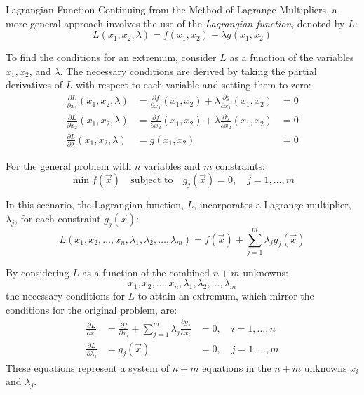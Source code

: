 \documentclass[
    NAME={Dr. Helga Ingimundardóttir},
    EMAIL={helgaingim@hi.is},
    FACULTY={Industrial Engineering},
    TITLE={Nonlinear Optimization},
    SUBTITLE={Approaches and Challenges},
    SEMINAR={VÉL113F},
    DATE={Design and Optimization}
]{../HI-latex/hi-beamer}
\begin{document}
    \begin{frame}{Lagrangian Function}
        Continuing from the Method of Lagrange Multipliers, a more general approach involves the use of the
        \emph{Lagrangian function}, denoted by \(L\):
        \[ L(x_1,x_2,\lambda) = f(x_1,x_2)+\lambda g(x_1,x_2)\]

        To find the conditions for an extremum, consider $L$ as a function of the variables $x_1, x_2$, and $\lambda$.
        The necessary conditions are derived by taking the partial derivatives of $L$ with respect to each
        variable and setting them to zero:
        \begin{align*}
            \frac{\partial L}{\partial x_1}(x_1,x_2,\lambda) &= \frac{\partial f}{\partial x_1}(x_1,x_2)+\lambda\frac{\partial g}{\partial x_1}(x_1,x_2) &= 0 \\
            \frac{\partial L}{\partial x_2}(x_1,x_2,\lambda) &= \frac{\partial f}{\partial x_2}(x_1,x_2)+\lambda\frac{\partial g}{\partial x_2}(x_1,x_2) &= 0 \\
            \frac{\partial L}{\partial \lambda}(x_1,x_2,\lambda) &= g(x_1,x_2) &= 0
        \end{align*}

        \framebreak

        For the general problem with \(n\) variables and \(m\) constraints:
        \[ \min f(\vec{x}) \quad \text{subject to}\quad g_j(\vec{x})=0, \quad j=1,\ldots,m\]

        In this scenario, the Lagrangian function, \(L\), incorporates a Lagrange multiplier, \(\lambda_j\), for each
        constraint \(g_j(\vec{x})\):
        \[ L(x_1,x_2,\ldots,x_n,\lambda_1,\lambda_2,\ldots,\lambda_m) =
        f(\vec{x}) + \sum_{j=1}^m \lambda_j g_j(\vec{x}) \]

        \framebreak
        By considering \(L\) as a function of the combined \(n+m\) unknowns:
        \[ x_1,x_2,\ldots,x_n,\lambda_1,\lambda_2,\ldots,\lambda_m \]
        the \alert{necessary conditions} for $L$ to attain an extremum, which mirror the conditions for the original
        problem, are:
        \begin{align*}
            \frac{\partial L}{\partial x_i}
            &= \frac{\partial f}{\partial x_i} + \sum_{j=1}^m \lambda_j \frac{\partial g_j}{\partial x_i}
            &= 0, \quad  i=1,\ldots,n \\
            \frac{\partial L}{\partial \lambda_j}
            &= g_j(\vec{x})
            &= 0, \quad  j=1,\ldots,m
        \end{align*}
        These equations represent a system of \(n+m\) equations in the \(n+m\) unknowns \(x_i\) and \(\lambda_j\).


\end{frame}
\end{document}
